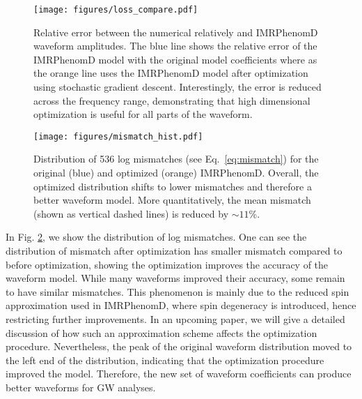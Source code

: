 \documentclass[twocolumn]{aastex631}
\begin{document}
\begin{figure}[t]
	\begin{centering}
		\texttt{[image: figures/loss\_compare.pdf]}
		\caption{
			Relative error between the numerical relatively and IMRPhenomD waveform amplitudes. 
            The blue line shows the relative error of the IMRPhenomD model with the original model coefficients where as the orange line uses the IMRPhenomD model after optimization using stochastic gradient descent.
            Interestingly, the error is reduced across the frequency range, demonstrating that high dimensional optimization is useful for all parts of the waveform.
		}
		\label{fig:loss_compare}
	\end{centering}
\end{figure}

\begin{figure}[t]
	\begin{centering}
		\texttt{[image: figures/mismatch\_hist.pdf]}
		\caption{
			Distribution of 536 log mismatches (see Eq.~\ref{eq:mismatch}) for the original (blue) and optimized (orange) IMRPhenomD. 
            Overall, the optimized distribution shifts to lower mismatches and therefore a better waveform model. 
            More quantitatively, the mean mismatch (shown as vertical dashed lines) is reduced by $\sim11$\%.
		}
		\label{fig:mismatch_hist}
	\end{centering}
\end{figure}
 
In Fig. \ref{fig:mismatch_hist}, we show the distribution of log mismatches.
One can see the distribution of mismatch after optimization has smaller mismatch compared to before optimization,
showing the optimization improves the accuracy of the waveform model.
While many waveforms improved their accuracy, some remain to have similar mismatches. This phenomenon is mainly due to the reduced spin approximation used in IMRPhenomD, where spin degeneracy is introduced, hence restricting further improvements. In an upcoming paper, we will give a detailed discussion of how such an approximation scheme affects the optimization procedure. 
Nevertheless, the peak of the original waveform distribution moved to the left end of the distribution, indicating that the optimization procedure improved the model. 
Therefore, the new set of waveform coefficients can produce better waveforms for GW analyses. 
\end{document}

